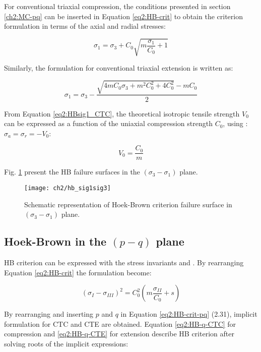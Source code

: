 For conventional triaxial compression, the conditions presented in section \ref{ch2:MC-pq} can be inserted in Equation \ref{eq2:HB-crit} to obtain the criterion formulation in terms of the axial and radial stresses:

\begin{equation}\label{eq2:HBsig1_CTC}
    \sigma_{1}=\sigma_{3}+C_{0} \sqrt{m \frac{\sigma_{1}}{C_{0}}+1}
\end{equation}

Similarly, the formulation for conventional triaxial extension is written as:

\begin{equation}\label{eq2:HBsig1_CTE}
    \sigma_{1}=\sigma_{3} - \frac{\sqrt{4 m C_{0} \sigma_{3}+m^{2} C_{0}^{2}+4 C_{0}^{2}}-m C_{0}}{2}
\end{equation}

From Equation \ref{eq2:HBsig1_CTC}, the theoretical isotropic tensile strength $V_0$ can be expressed as a function of the uniaxial compression strength $C_0$, using : $\sigma_a = \sigma_r = -V_0$:

\begin{equation}
    V_0 = \frac{C_0}{m}
\end{equation}

Fig. \ref{fig2:hb_sig1sig3} present the HB failure surfaces in the $(\sigma_3 -\sigma_1)$ plane. 

\begin{figure}[tb]
    \centering
    \texttt{[image: ch2/hb\_sig1sig3]}
    \caption{Schematic representation of Hoek-Brown criterion failure surface in $(\sigma_3 -\sigma_1)$ plane.}
    \label{fig2:hb_sig1sig3}
\end{figure} 

\subsection{Hoek-Brown in the \texorpdfstring{$(p-q)$}{p-q} plane}

HB criterion can be expressed with the stress invariants  and . By rearranging Equation \ref{eq2:HB-crit} the formulation become:

\begin{equation}\label{eq2:HB-crit-pq}
    \left(\sigma_{I}-\sigma_{I I I}\right)^{2}=C_{0}^{2}\left(m \frac{\sigma_{I I}}{C_{0}}+s\right)
\end{equation}

By rearranging and inserting $p$  and $q$ in Equation \ref{eq2:HB-crit-pq} (2.31), implicit formulation for CTC and CTE are obtained. Equation \ref{eq2:HB-q-CTC} for compression and \ref{eq2:HB-q-CTE} for extension describe HB criterion after solving roots of the implicit expressions:  


